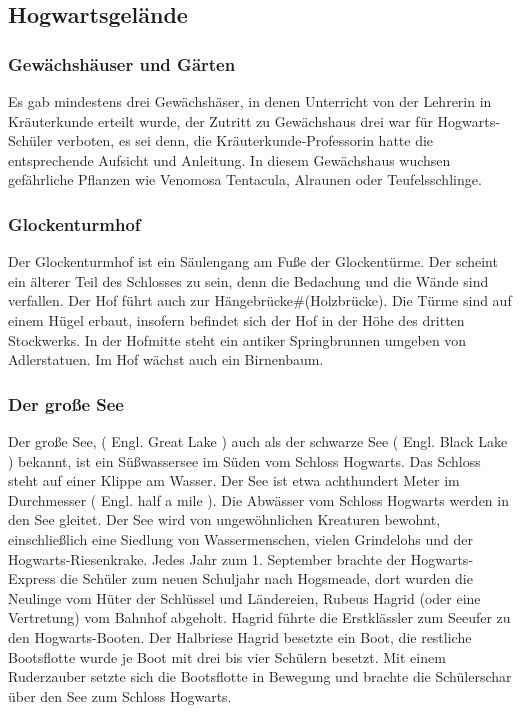 \documentclass[a4paper, 10pt]{article}
\begin{document}
\subsection*{\Large Hogwartsgelände}
\subsubsection*{\large Gewächshäuser und Gärten}
Es gab mindestens drei Gewächshäser, in denen Unterricht von der Lehrerin in Kräuterkunde erteilt wurde, der Zutritt zu Gewächshaus drei war für Hogwarts-Schüler verboten, es sei denn, die Kräuterkunde-Professorin hatte die entsprechende Aufsicht und Anleitung. In diesem Gewächshaus wuchsen gefährliche Pflanzen wie Venomosa Tentacula, Alraunen oder Teufelsschlinge.
\subsubsection*{\large Glockenturmhof}
Der Glockenturmhof ist ein Säulengang am Fuße der Glockentürme. Der scheint ein älterer Teil des Schlosses zu sein, denn die Bedachung und die Wände sind verfallen. Der Hof führt auch zur Hängebrücke#(Holzbrücke). Die Türme sind auf einem Hügel erbaut, insofern befindet sich der Hof in der Höhe des dritten Stockwerks. In der Hofmitte steht ein antiker Springbrunnen umgeben von Adlerstatuen. Im Hof wächst auch ein Birnenbaum.

\subsubsection*{\large Der große See}
Der große See, (  Engl.  Great Lake ) auch als der schwarze See (  Engl.  Black Lake ) bekannt, ist ein Süßwassersee im Süden vom Schloss Hogwarts. Das Schloss steht auf einer Klippe am Wasser. Der See ist etwa achthundert Meter im Durchmesser (  Engl.  half a mile ). Die Abwässer vom Schloss Hogwarts werden in den See gleitet. Der See wird von ungewöhnlichen Kreaturen bewohnt, einschließlich eine Siedlung von Wassermenschen, vielen Grindelohs und der Hogwarts-Riesenkrake.
\vspace{10pt}
\newline
Jedes Jahr zum 1. September brachte der Hogwarts-Express die Schüler zum neuen Schuljahr nach Hogsmeade, dort wurden die Neulinge vom Hüter der Schlüssel und Ländereien, Rubeus Hagrid (oder eine Vertretung) vom Bahnhof abgeholt. Hagrid führte die Erstklässler zum Seeufer zu den Hogwarts-Booten. Der Halbriese Hagrid besetzte ein Boot, die restliche Bootsflotte wurde je Boot mit drei bis vier Schülern besetzt. Mit einem Ruderzauber setzte sich die Bootsflotte in Bewegung und brachte die Schülerschar über den See zum Schloss Hogwarts.
\end{document}
